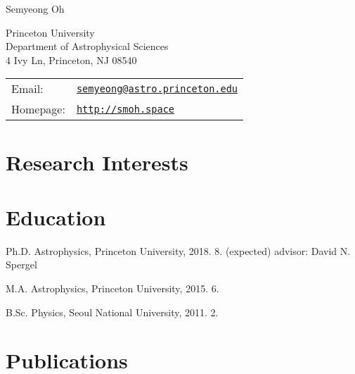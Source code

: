 \documentclass[11pt,letterpaper]{article}
\def\name{Semyeong Oh}
\renewenvironment{itemize}{
  \begin{list}{}{
    \setlength{\leftmargin}{1.5em}
  }
}{
  \end{list}
}
\begin{document}
{\huge \name}


\vspace{0.1in}

\begin{minipage}{0.45\linewidth}
  Princeton University \\
  Department of Astrophysical Sciences \\
  4 Ivy Ln, Princeton, NJ 08540
\end{minipage}
\begin{minipage}{0.45\linewidth}
  \begin{tabular}{ll}
    Email: & \href{mailto:semyeong@astro.princeton.edu}{\tt semyeong@astro.princeton.edu}\\
    Homepage: & \href{http://smoh.space}{\tt http://smoh.space} \\
  \end{tabular}
\end{minipage}


\section*{Research Interests}


\section*{Education}

\begin{itemize}
  \setlength\itemsep{0.2em}
  \item Ph.D. Astrophysics, Princeton University, 2018. 8. (expected)
    advisor: David N. Spergel

  \item M.A. Astrophysics, Princeton University, 2015. 6.


  \item B.Sc. Physics, Seoul National University, 2011. 2.
\end{itemize}


\section*{Publications}
\end{document}
